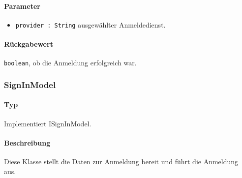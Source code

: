 \paragraph*{Parameter}
\begin{itemize}
    \item \texttt{provider : String} ausgewählter Anmeldedienst.
\end{itemize}
\paragraph*{Rückgabewert}
\texttt{boolean}, ob die Anmeldung erfolgreich war.

\subsubsection{SignInModel}
\paragraph*{Typ}
Implementiert ISignInModel.
\paragraph*{Beschreibung}
Diese Klasse stellt die Daten zur Anmeldung bereit und führt die Anmeldung aus.